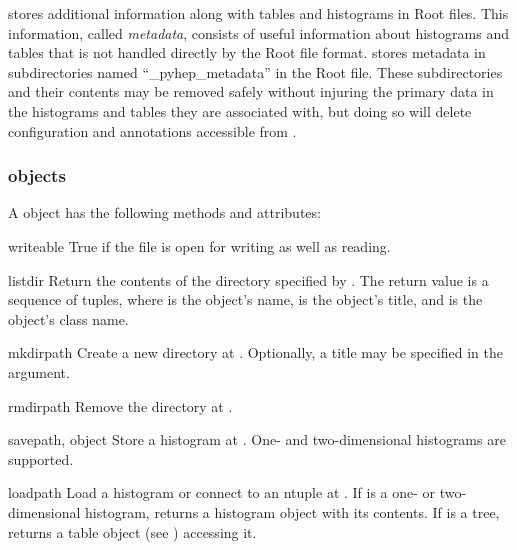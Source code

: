 \pyhep stores additional information along with tables and histograms in
Root files.  This information, called \emph{metadata}, consists of
useful information about histograms and tables that is not handled
directly by the Root file format.  \pyhep stores metadata in
subdirectories named ``_pyhep_metadata'' in the Root file.  These
subdirectories and their contents may be removed safely without injuring
the primary data in the histograms and tables they are associated with,
but doing so will delete configuration and annotations accessible from
\pyhep.

\subsubsection{ objects}

A  object has the following methods and attributes:

\begin{memberdesc}{writeable}
 True if the file is open for writing as well as reading.
\end{memberdesc}

\begin{methoddesc}{listdir}{}
 Return the contents of the directory specified by .  The
 return value is a sequence of  tuples,
 where  is the object's name,  is the object's
 title, and  is the object's class name.
\end{methoddesc}

\begin{methoddesc}{mkdir}{path}
 Create a new directory at .  Optionally, a title may be
 specified in the  argument.
\end{methoddesc}

\begin{methoddesc}{rmdir}{path}
 Remove the directory at .
\end{methoddesc}

\begin{methoddesc}{save}{path, object}
 Store a histogram  at .  One- and two-dimensional
 histograms are supported.  
\end{methoddesc}

\begin{methoddesc}{load}{path}
 Load a histogram or connect to an ntuple at .  If 
 is a one- or two-dimensional histogram, returns a histogram object with
 its contents.  If  is a tree, returns a table object (see
 ) accessing it.
\end{methoddesc}

